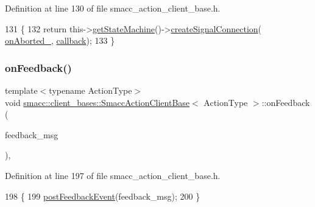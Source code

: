 Definition at line 130 of file smacc\+\_\+action\+\_\+client\+\_\+base.\+h.


\begin{DoxyCode}
131     \{
132         \textcolor{keywordflow}{return} this->\hyperlink{classsmacc_1_1ISmaccClient_aec51d4712404cb9882b86e4c854bb93a}{getStateMachine}()->\hyperlink{classsmacc_1_1ISmaccStateMachine_adf0f42ade0c65cc471960fe2a7c42da2}{createSignalConnection}(
      \hyperlink{classsmacc_1_1client__bases_1_1SmaccActionClientBase_adc33748ca4fcef9730f8039b75d496d0}{onAborted\_}, \hyperlink{sm__ridgeback__barrel__search__1_2servers_2opencv__perception__node_2opencv__perception__node_8cpp_a050e697bd654facce10ea3f6549669b3}{callback});
133     \}
\end{DoxyCode}
\mbox{\label{classsmacc_1_1client__bases_1_1SmaccActionClientBase_a5a88fd084076729e9cb864e45338af47}} 
\subsubsection{\texorpdfstring{on\+Feedback()}{onFeedback()}}
{\footnotesize\ttfamily template$<$typename Action\+Type$>$ \\
void \hyperlink{classsmacc_1_1client__bases_1_1SmaccActionClientBase}{smacc\+::client\+\_\+bases\+::\+Smacc\+Action\+Client\+Base}$<$ Action\+Type $>$\+::on\+Feedback (\begin{DoxyParamCaption}\item[{const Feedback\+Const\+Ptr \&}]{feedback\+\_\+msg }\end{DoxyParamCaption})\hspace{0.3cm}{\ttfamily [inline]}, {\ttfamily [protected]}}



Definition at line 197 of file smacc\+\_\+action\+\_\+client\+\_\+base.\+h.


\begin{DoxyCode}
198     \{
199         \hyperlink{classsmacc_1_1client__bases_1_1SmaccActionClientBase_ac754fb0adfc982fe1adde0d92842a33b}{postFeedbackEvent}(feedback\_msg);
200     \}
\end{DoxyCode}
\mbox{\label{classsmacc_1_1client__bases_1_1SmaccActionClientBase_a925a611bc8035a0f70248c6ab11f4221}} 
